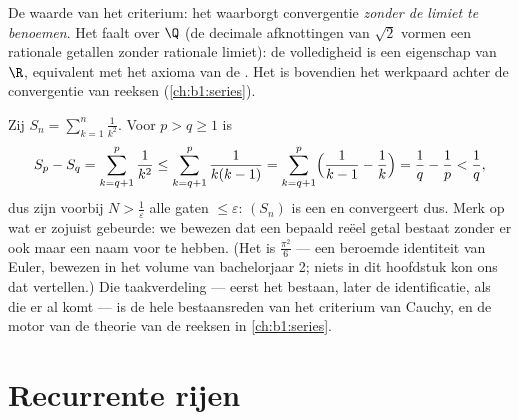 \begin{remark}
De waarde van het criterium: het waarborgt convergentie \emph{zonder de
limiet te benoemen}. Het faalt over $\Q$ (de decimale afknottingen van
$\sqrt 2$ vormen een  rationale getallen zonder rationale
limiet): de volledigheid is een eigenschap van $\R$, equivalent met het
axioma van de . Het is bovendien het werkpaard achter de
convergentie van reeksen (\cref{ch:b1:series}).
\end{remark}

\begin{example}\label{ex:b1:seq:basel}
Zij $S_n = \sum_{k=1}^{n} \frac{1}{k^2}$. Voor $p > q \geq 1$ is
\[
S_p - S_q = \sum_{k=q+1}^{p} \frac{1}{k^2}
\leq \sum_{k=q+1}^{p} \frac{1}{k(k-1)}
= \sum_{k=q+1}^{p} \Bigl(\frac{1}{k-1} - \frac 1k\Bigr)
= \frac 1q - \frac 1p < \frac 1q ,
\]
dus zijn voorbij $N > \frac1\varepsilon$ alle gaten $\leq \varepsilon$:
$(S_n)$ is een  en convergeert dus. Merk op wat er zojuist
gebeurde: we bewezen dat een bepaald reëel getal bestaat zonder er ook
maar een naam voor te hebben. (Het is $\frac{\pi^2}{6}$ --- een beroemde
identiteit van Euler, bewezen in het volume van bachelorjaar 2; niets in
dit hoofdstuk kon ons dat vertellen.) Die taakverdeling --- eerst het
bestaan, later de identificatie, als die er al komt --- is de hele
bestaansreden van het criterium van Cauchy, en de motor van de theorie
van de reeksen in \cref{ch:b1:series}.
\end{example}

\section{Recurrente rijen}

